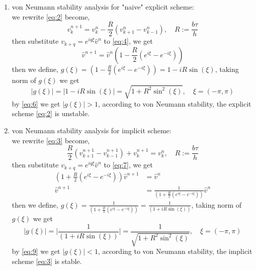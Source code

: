 \documentclass[a4paper,12pt]{article}
\begin{document}
\begin{enumerate}
	\item von Neumann stability analysis for "naive" explicit scheme:\\
	we rewrite \eqref{eq:2} become,
	\begin{equation}\label{eq:4}
	v_k^{n+1} = v_k^n - \frac{R}{2}(v_{k+1}^n - v_{k-1}^n), \quad R:=\frac{b\tau}{h}
	\end{equation}
	then substitute $v_{k+q} = e^{iq\xi}\hat{v}^n$ to \eqref{eq:4}, we get
	\begin{equation}\label{eq:5}
	\hat{v}^{n+1} = \hat{v}^n \left( 1- \frac{R}{2} (e^{i\xi}-e^{-i\xi}) \right)
	\end{equation}
	then we define, $g(\xi) = \left( 1- \frac{R}{2} (e^{i\xi}-e^{-i\xi}) \right) = 1-iR \sin (\xi)$, taking norm of $g(\xi)$ we get
	\begin{equation}\label{eq:6}
	|g(\xi)| = |1-iR\sin (\xi)| = \sqrt{1+R^2\sin^2(\xi)}, \quad \xi = (-\pi,\pi)
	\end{equation}
	by \eqref{eq:6} we get $|g(\xi)| > 1$, according to von Neumann stability, the explicit scheme \eqref{eq:2} is unstable.
	
	\item von Neumann stability analysis for implicit scheme:\\
	we rewrite \eqref{eq:3} become,
	\begin{equation}\label{eq:7}
	\frac{R}{2} \left(v_{k+1}^{n+1} - v_{k-1}^{n+1}\right) + v_k^{n+1} = v_k^n, \quad R:=\frac{b\tau}{h}
	\end{equation}
	then substitute $v_{k+q} = e^{iq\xi}\hat{v}^n$ to \eqref{eq:7}, we get
	\begin{equation}\label{eq:8}
	\begin{aligned}
	\left(1+\frac{R}{2} \left(e^{i\xi}-e^{-i\xi}\right) \right) \hat{v}^{n+1} &= \hat{v}^{n}\\
	\hat{v}^{n+1} &= \frac{1}{\left(1+\frac{R}{2} \left(e^{i\xi}-e^{-i\xi}\right) \right)} \hat{v}^{n}
	\end{aligned}
	\end{equation}
	then we define, $g(\xi) = \frac{1}{\left(1+\frac{R}{2} \left(e^{i\xi}-e^{-i\xi}\right) \right)} = \frac{1}{\left(1+iR\sin(\xi) \right)}$, taking norm of $g(\xi)$ we get
	\begin{equation}\label{eq:9}
	|g(\xi)| = \Bigr|\frac{1}{\left(1+iR\sin(\xi) \right)}\Bigr| = \frac{1}{\sqrt{1+R^2 \sin^2 (\xi)}}, \quad \xi = (-\pi,\pi)
	\end{equation}
	by \eqref{eq:9} we get $|g(\xi)| < 1$, according to von Neumann stability, the implicit scheme \eqref{eq:3} is stable.
	

\end{enumerate}
\end{document}

